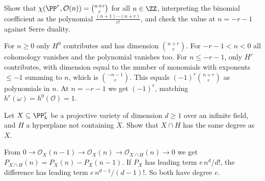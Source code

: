 \begin{exercise}\label{schemes:exercise-euler-projective}
Show that $\chi(\PP^r, \mathcal{O}(n)) = \binom{n+r}{r}$ for all $n \in \ZZ$, interpreting the binomial coefficient as the polynomial $\frac{(n+1)\cdots(n+r)}{r!}$, and check the
value at $n = -r-1$ against Serre duality.
\end{exercise}

\begin{solution}
For $n \geq 0$ only $H^0$ contributes and has dimension $\binom{n+r}{r}$. For $-r-1 < n < 0$ all cohomology vanishes and the polynomial vanishes too. For $n \leq -r-1$, only $H^r$
contributes, with dimension equal to the number of monomials with exponents $\leq -1$ summing to $n$, which is $\binom{-n-1}{r}$. This equals $(-1)^r\binom{n+r}{r}$
as polynomials in $n$. At $n = -r-1$ we get $(-1)^r$, matching $h^r(\omega) = h^0(\mathcal{O}) = 1$.
\end{solution}

\begin{exercise}\label{schemes:exercise-degree-hyperplane}
Let $X \subseteq \PP^r_k$ be a projective variety of dimension $d \geq 1$ over an infinite field, and $H$ a hyperplane not containing $X$. Show that $X \cap H$ has the same
degree as $X$.
\end{exercise}

\begin{solution}
From $0 \to \mathcal{O}_X(n - 1) \to \mathcal{O}_X(n) \to \mathcal{O}_{X \cap H}(n) \to 0$ we get $P_{X \cap H}(n) = P_X(n) - P_X(n-1)$. If $P_X$ has leading term $e\,n^d/d!$, the
difference has leading term $e\,n^{d-1}/(d-1)!$. So both have degree $e$.
\end{solution}

